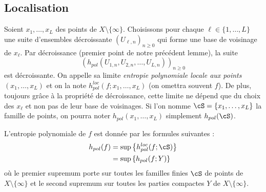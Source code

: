 \subsection{Localisation}\label{ss.localization}

Soient $x_{1}, \dots, x_{L}$ des points de $X \setminus \{\infty\}$. Choisissons pour chaque $\ell \in \{1,\dots,L\}$ une suite d'ensembles décroissante $(U_{\ell, n})_{n \geq 0}$ qui forme une base de voisinage de $x_{\ell}$. Par décroissance (premier point de notre précédent lemme), la suite
\[
\left(h_{pol}(U_{1,n},U_{2,n}, \dots, U_{L,n})\right)_{n \geq 0}
\]
est décroissante. On appelle sa limite \emph{entropie polynomiale locale aux points $(x_{1}, \dots, \allowbreak x_{L})$} et on la note $h^{loc}_{pol}(f;x_{1}, \dots, x_{L})$ (on omettra souvent \og$f$\fg). De plus, {toujours grâce à la propriété de décroissance,} cette limite ne dépend que du choix des $x_{\ell}$ et non pas de leur base de voisinages. Si l'on nomme $\cS = \{x_{1}, \dots, x_{L}\}$ la famille de points, on pourra noter $h_{pol}(x_{1}, \dots, x_{L})$ simplement $h_{pol}(\cS)$.


\begin{prop}[Localisation]\label{prop.localization}
L'entropie polynomiale de $f$ est donnée par les formules suivantes :
\begin{align*}
h_{pol}(f) & = \sup\left\{h^{loc}_{pol}(f;\cS)\right\} \\
&= \sup \left\{ h_{pol}(f;Y)\right\}
\end{align*}
où le premier supremum porte sur toutes les familles finies $\cS$ de points de $X\setminus \{\infty\}$ et le second supremum sur {toutes les parties compactes} $Y$ de $X\setminus \{\infty\}$.
\end{prop}


